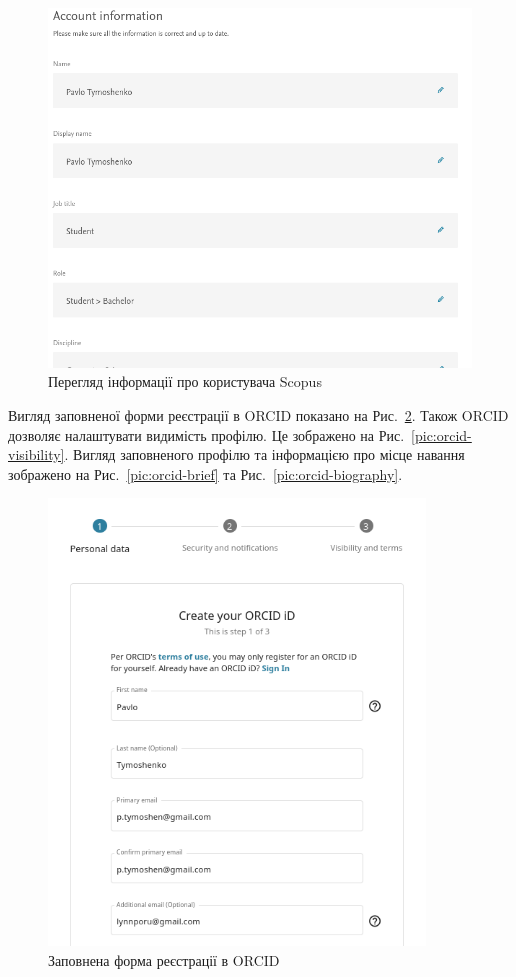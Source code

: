 \documentclass[oneside,14pt,a4paper]{extreport}
\begin{document}
\begin{figure}[H]
    \centering
    \includegraphics[width=15cm]{imgs/scopus_account.png}
    \caption{Перегляд інформації про користувача Scopus}
    \label{pic:scopus-account}
\end{figure}

Вигляд заповненої форми реєстрації в ORCID показано на Рис.~\ref{pic:orcid-signup-filled}. Також ORCID дозволяє налаштувати видимість профілю. Це зображено на Рис.~\ref{pic:orcid-visibility}. Вигляд заповненого профілю та інформацією про місце навання зображено на Рис.~\ref{pic:orcid-brief} та Рис.~\ref{pic:orcid-biography}.

\begin{figure}[H]
    \centering
    \includegraphics[width=10cm]{imgs/orcid_signup_filled.png}
    \caption{Заповнена форма реєстрації в ORCID}
    \label{pic:orcid-signup-filled}
\end{figure}
\end{document}
